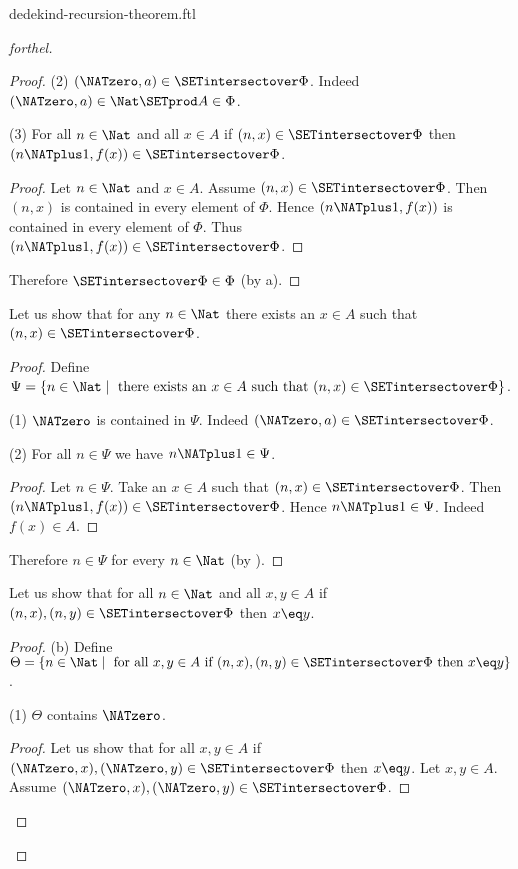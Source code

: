 \documentclass{naproche-library}
\begin{document}
\begin{smodule}[title=Dedekind's Recursion Theorem]{dedekind-recursion-theorem.ftl}
\begin{proof}[forthel]
\begin{proof}
    (2) $(\NATzero, a) \in \SETintersectover \Phi$.
    Indeed $(\NATzero, a) \in \Nat \SETprod A \in \Phi$.

    (3) For all $n \in \Nat$ and all $x \in A$ if $(n, x) \in
    \SETintersectover \Phi$ then $(n \NATplus 1, f(x)) \in \SETintersectover \Phi$.
    \begin{proof}
      Let $n \in \Nat$ and $x \in A$.
      Assume $(n, x) \in \SETintersectover \Phi$.
      Then $(n, x)$ is contained in every element of $\Phi$.
      Hence $(n \NATplus 1, f(x))$ is contained in every element of $\Phi$.
      Thus $(n \NATplus 1, f(x)) \in \SETintersectover \Phi$.
    \end{proof}

    Therefore $\SETintersectover \Phi \in \Phi$ (by a).
  \end{proof}

  Let us show that for any $n \in \Nat$ there exists an $x \in A$ such
  that $(n, x) \in \SETintersectover \Phi$.
  \begin{proof}
    Define $\Psi = \{ n \in \Nat \mid \text{ there exists an }x \in A\text{ such
    that }(n, x) \in \SETintersectover \Phi \}$.

    (1) $\NATzero$ is contained in $\Psi$.
    Indeed $(\NATzero, a) \in \SETintersectover \Phi$.

    (2) For all $n \in \Psi$ we have $n \NATplus 1 \in \Psi$.
    \begin{proof}
      Let $n \in \Psi$.
      Take an $x \in A$ such that $(n, x) \in \SETintersectover \Phi$.
      Then $(n \NATplus 1, f(x)) \in \SETintersectover \Phi$.
      Hence $n \NATplus 1 \in \Psi$.
      Indeed $f(x) \in A$.
    \end{proof}

    Therefore $n \in \Psi$ for every $n \in \Nat$ (by ).
  \end{proof}

  Let us show that for all $n \in \Nat$ and all $x, y \in A$ if
  $(n, x), (n, y) \in \SETintersectover \Phi$ then $x \eq y$.
  \begin{proof}
    (b) Define $\Theta = \{ n \in \Nat \mid \text{ for all }x, y \in A\text{ if }
    (n, x), (n, y) \in \SETintersectover \Phi\text{ then }x \eq y \}$.

    (1) $\Theta$ contains $\NATzero$.
    \begin{proof}
      Let us show that for all $x, y \in A$ if $(\NATzero, x), (\NATzero, y) \in
      \SETintersectover \Phi$ then $x \eq y$.
        Let $x, y \in A$.
        Assume $(\NATzero, x), (\NATzero, y) \in \SETintersectover \Phi$.


\end{proof}
\end{proof}
\end{proof}
\end{smodule}
\end{document}
